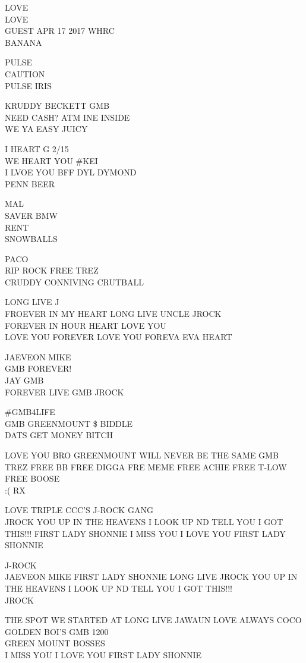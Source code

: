 \documentclass[10pt,letterpaper]{article}
\begin{document}
LOVE\\
LOVE\\
GUEST APR 17 2017 WHRC\\
BANANA

PULSE\\
CAUTION\\
PULSE IRIS

KRUDDY BECKETT GMB\\
NEED CASH?  ATM INE INSIDE\\
WE YA EASY JUICY

I HEART G 2/15\\
WE HEART YOU \#KEI\\
I LVOE YOU BFF DYL DYMOND\\
PENN BEER

MAL\\
SAVER BMW\\
RENT\\
SNOWBALLS

PACO\\
RIP ROCK FREE TREZ\\
CRUDDY CONNIVING CRUTBALL

LONG LIVE J\\
FROEVER IN MY HEART LONG LIVE UNCLE JROCK\\
FOREVER IN HOUR HEART LOVE YOU\\
LOVE YOU FOREVER LOVE YOU FOREVA EVA HEART

JAEVEON MIKE\\
GMB FOREVER!\\
JAY GMB\\
FOREVER LIVE GMB JROCK

\#GMB4LIFE\\
GMB GREENMOUNT \$ BIDDLE\\
DATS GET MONEY BITCH

LOVE YOU BRO GREENMOUNT WILL NEVER BE THE SAME GMB\\
TREZ FREE BB FREE DIGGA FRE MEME FREE ACHIE FREE T{-}LOW FREE BOOSE\\
:( RX

LOVE TRIPLE CCC'S J{-}ROCK GANG\\
JROCK YOU UP IN THE HEAVENS I LOOK UP ND TELL YOU I GOT THIS!!! FIRST LADY SHONNIE I MISS YOU I LOVE YOU FIRST LADY SHONNIE

J{-}ROCK\\
JAEVEON MIKE FIRST LADY SHONNIE LONG LIVE JROCK YOU UP IN THE HEAVENS I LOOK UP ND TELL YOU I GOT THIS!!!\\
JROCK

THE SPOT WE STARTED AT LONG LIVE JAWAUN LOVE ALWAYS COCO\\
GOLDEN BOI'S GMB 1200\\
GREEN MOUNT BOSSES\\
I MISS YOU I LOVE YOU FIRST LADY SHONNIE
\end{document}
